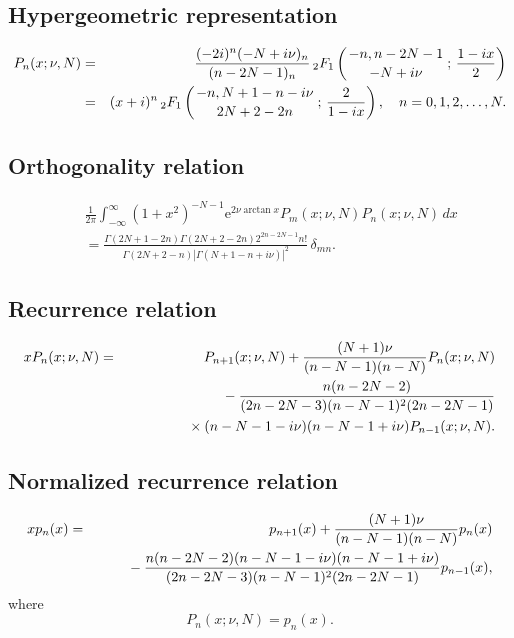 \documentclass[envcountchap,graybox]{svmono}
\newcommand{\hyp}[5]{\mbox{}_{#1}{F}_{#2}
\left(\genfrac{}{}{0pt}{}{#3}{#4}\,;\,#5\right)}
\newcommand{\mathindent}{\hspace{7.5mm}}
\newcommand{\e}{\textrm{e}}
\renewcommand{\Gamma}{\varGamma}
\begin{document}
\par\setcounter{equation}{0}

\subsection*{Hypergeometric representation}
\begin{eqnarray}
\label{DefPseudoJacobi}
P_n(x;\nu,N)&=&\frac{(-2i)^n(-N+i\nu)_n}{(n-2N-1)_n}\,\hyp{2}{1}{-n,n-2N-1}{-N+i\nu}{\frac{1-ix}{2}}\\
&=&(x+i)^n\,\hyp{2}{1}{-n,N+1-n-i\nu}{2N+2-2n}{\frac{2}{1-ix}},\quad n=0,1,2,\ldots,N.\nonumber
\end{eqnarray}

\subsection*{Orthogonality relation}
\begin{eqnarray}
\label{OrtPseudoJacobi}
& &\frac{1}{2\pi}\int_{-\infty}^{\infty}(1+x^2)^{-N-1}\e^{2\nu\arctan x}P_m(x;\nu,N)P_n(x;\nu,N)\,dx\nonumber\\
& &{}=\frac{\Gamma(2N+1-2n)\Gamma(2N+2-2n)2^{2n-2N-1}n!}{\Gamma(2N+2-n)\left|\Gamma(N+1-n+i\nu)\right|^2}\,\delta_{mn}.
\end{eqnarray}

\subsection*{Recurrence relation}
\begin{eqnarray}
\label{RecPseudoJacobi}
xP_n(x;\nu,N)&=&P_{n+1}(x;\nu,N)+\frac{(N+1)\nu}{(n-N-1)(n-N)}P_n(x;\nu,N)\nonumber\\
& &{}\mathindent{}-\frac{n(n-2N-2)}{(2n-2N-3)(n-N-1)^2(2n-2N-1)}\nonumber\\
& &{}\mathindent\mathindent\times(n-N-1-i\nu)(n-N-1+i\nu)P_{n-1}(x;\nu,N).
\end{eqnarray}

\subsection*{Normalized recurrence relation}
\begin{eqnarray}
\label{NormRecPseudoJacobi}
xp_n(x)&=&p_{n+1}(x)+\frac{(N+1)\nu}{(n-N-1)(n-N)}p_n(x)\nonumber\\
& &{}\mathindent{}-\frac{n(n-2N-2)(n-N-1-i\nu)(n-N-1+i\nu)}{(2n-2N-3)(n-N-1)^2(2n-2N-1)}p_{n-1}(x),
\end{eqnarray}
where
$$P_n(x;\nu,N)=p_n(x).$$
\end{document}
